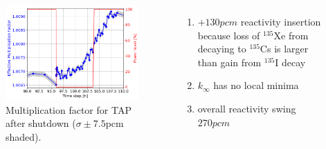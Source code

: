 \begin{frame}
\begin{textblock*}{12.5cm}
\begin{columns}
{		\begin{figure}[t]
		\includegraphics[width=\linewidth]{./images/tap_keff_zoomed.png}
		\vspace{-6mm}
		\caption{Multiplication factor for
TAP after 
			shutdown ($\sigma\pm7.5$pcm shaded).}
		\end{figure}
		\vspace{-5mm}
		\begin{enumerate}             
		\item $+130pcm$ reactivity insertion because loss of $^{135}$Xe from  
		decaying to $^{135}$Cs is larger than gain from $^{135}$I decay
		\item $k_{\infty}$ has no local minima
		\item overall reactivity swing $270pcm$
		\end{enumerate}

	}

\end{columns}
\end{textblock*}
\end{frame}

